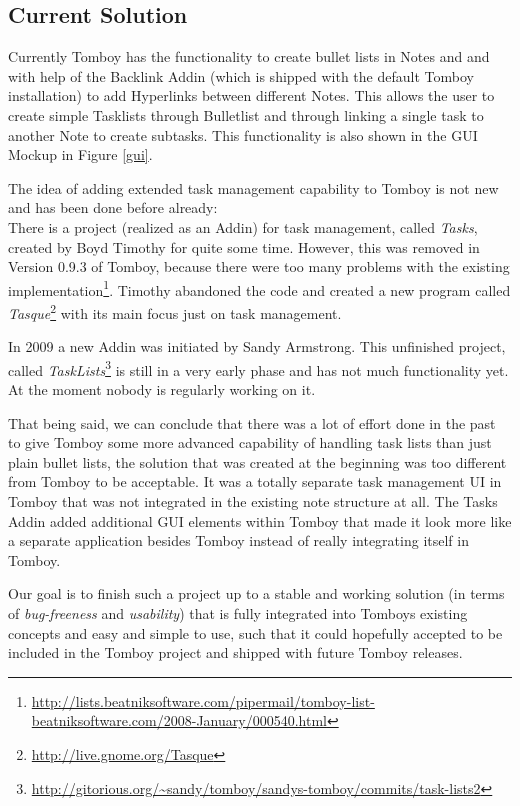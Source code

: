 \subsection{Current Solution}
\label{description:solution}
Currently Tomboy has the functionality to create bullet lists in Notes and and with help of the Backlink Addin (which is shipped with the default Tomboy installation) to add Hyperlinks between different Notes. This allows the user to create simple Tasklists through Bulletlist and through linking a single task to another Note to create subtasks. This functionality is also shown in the GUI Mockup in Figure \ref{gui}.

The idea of adding extended task management capability to Tomboy is not new and has been done before already:\\
There is a project (realized as an Addin) for task management, called \textit{Tasks}, created by Boyd Timothy
for quite some time. However, this was removed in Version 0.9.3 of Tomboy, because there were too many problems with the existing implementation\footnote{\url{http://lists.beatniksoftware.com/pipermail/tomboy-list-beatniksoftware.com/2008-January/000540.html}}. Timothy abandoned the code and created a new program called \textit{Tasque}\footnote{\url{http://live.gnome.org/Tasque}} with its main focus just on task management.

In 2009 a new Addin was initiated by Sandy Armstrong. This unfinished project, called \textit{TaskLists}\footnote{\url{http://gitorious.org/~sandy/tomboy/sandys-tomboy/commits/task-lists2}} is still in a very early phase and has not much functionality yet. At the moment nobody is regularly working on it.

That being said, we can conclude that there was a lot of effort done in the past to give Tomboy some more advanced capability of handling task lists than just plain bullet lists, the solution that was created at the beginning was too different from Tomboy to be acceptable. It was a totally separate task management UI in Tomboy that was not integrated in the existing note structure at all. The Tasks Addin added additional GUI elements within Tomboy that made it look more like a separate application besides Tomboy instead of really integrating itself in Tomboy.

Our goal is to finish such a project up to a stable and working solution (in terms of \textit{bug-freeness} and \textit{usability}) that is fully integrated into Tomboys existing concepts and easy and simple to use, such that it could hopefully accepted to be included in the Tomboy project and  shipped with future Tomboy releases.

